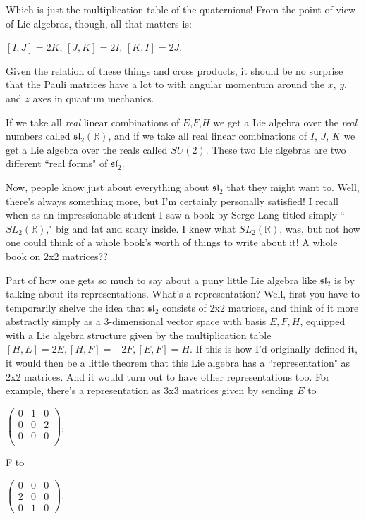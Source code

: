 Which is just the multiplication table of the quaternions! From the point of view of Lie algebras, though, all that matters is:

$[I,J] = 2K$,    $[J,K] = 2I$,    $[K,I] = 2J$.

Given the relation of these things and cross products, it should be no surprise that the Pauli matrices have a lot to with angular momentum around the $x$, $y$, and $z$ axes in quantum mechanics.

If we take all \textit{real} linear combinations of $E$,$F$,$H$ we get a Lie algebra over the \textit{real} numbers called $\mathfrak{sl}_2(\mathbb{R})$, and if we take all real linear combinations of $I$, $J$, $K$ we get a Lie algebra over the reals called $SU(2)$. These two Lie algebras are two different ``real forms" of $\mathfrak{sl}_2$.

Now, people know just about everything about $\mathfrak{sl}_2$ that they might want to. Well, there's always something more, but I'm certainly personally satisfied! I recall when as an impressionable student I saw a book by Serge Lang titled simply ``$SL_2(\mathbb{R})$," big and fat and scary inside. 
I knew what $SL_2(\mathbb{R})$, was, but not how one could think of a whole book's worth of things to write about it! A whole book on 2x2 matrices??

Part of how one gets so much to say about a puny little Lie algebra like $\mathfrak{sl}_2$ is by talking about its representations. What's a representation? Well, first you have to temporarily shelve the idea that $\mathfrak{sl}_2$ consists of 2x2 matrices, and think of it more abstractly simply as a 3-dimensional vector space with basis $E,F,H$, equipped with a Lie algebra structure given by the multiplication table $[H,E] = 2E, [H,F] = -2F, [E,F] = H$. If this is how I'd originally defined it, it would then be a little theorem that this Lie algebra has a ``representation" as 2x2 matrices. And it would turn out to have other representations too. For example, there's a representation as 3x3 matrices given by sending $E$ to

$\begin{pmatrix}
0 & 1 & 0 \\
0 & 0 & 2 \\
0 & 0 & 0 \\
\end{pmatrix}$,

F to

$\begin{pmatrix}
0 & 0 & 0 \\
2 & 0 & 0 \\
0 & 1 & 0 
\end{pmatrix}$,

